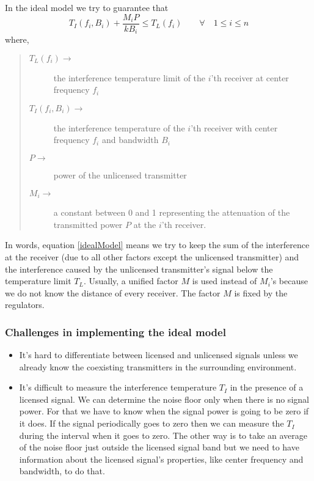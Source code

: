 \documentclass[12pt]{article}
\begin{document}
In the ideal model we try to guarantee that
\begin{equation}
    T_I(f_i,B_i) + \frac{M_iP}{kB_i} \leq T_L(f_i) \qquad \forall \quad 1 \leq i \leq n \label{idealModel}
\end{equation}
where,
\begin{quote}
\begin{description}
    \item[$T_L(f_i)\longrightarrow$] the interference temperature limit of the $i$'th receiver at center frequency $f_i$
    \item[$T_I(f_i,B_i)\longrightarrow$] the interference temperature of the $i$'th receiver with center frequency $f_i$ and bandwidth $B_i$
    \item[$P\longrightarrow$] power of the unlicensed transmitter
    \item[$M_i\longrightarrow$] a constant between 0 and 1 representing the attenuation of the  transmitted power $P$ at the $i$'th receiver.
\end{description}
\end{quote}

In words, equation \eqref{idealModel} means we try to keep the sum of the interference at the receiver (due to all other factors except the unlicensed transmitter) and the interference caused by the unlicensed transmitter's signal below the temperature limit $T_L$. Usually, a unified factor $M$ is used instead of $M_i$'s because we do not know the distance of every receiver. The factor $M$ is fixed by the regulators.

\subsubsection*{Challenges in implementing the ideal model}

\begin{itemize}
    \item It's hard to differentiate between licensed and unlicensed signals unless we already know the coexisting transmitters in the surrounding environment.
    \item It's difficult to measure the interference temperature $T_I$ in the presence of a licensed signal. We can determine the noise floor only when there is no signal power. For that we have to know when the signal power is going to be zero if it does. If the signal periodically goes to zero then we can measure the $T_I$ during the interval when it goes to zero. The other way is to take an average of the noise floor just outside the licensed signal band but we need to have information about the licensed signal's properties, like center frequency and bandwidth, to do that.
\end{itemize}
\end{document}
